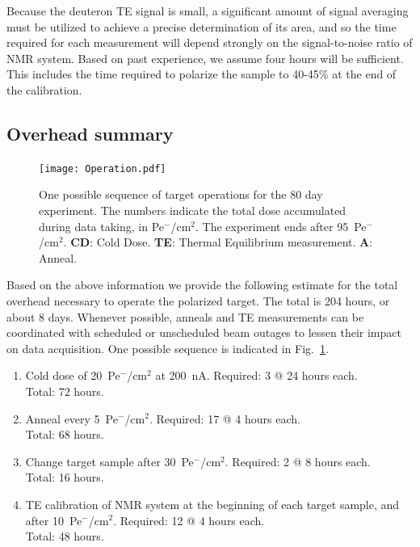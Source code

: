 \documentclass[preprint,12pt]{elsarticle}
\begin{document}
Because the deuteron TE signal is small, a significant amount of signal averaging must be utilized to achieve a precise determination of its area, and so the time required for each measurement will depend strongly on the signal-to-noise ratio of NMR system.  Based on past experience, we assume four hours will be sufficient.  This includes the time required to polarize the sample to 40-45\% at the end of the calibration.

\subsection{Overhead summary}

\begin{figure}
\begin{center}
\texttt{[image: Operation.pdf]}
\end{center}
\caption{One possible sequence of target operations for the 80 day experiment. The numbers indicate the total dose accumulated during data taking, in Pe$^-$/cm$^2$. The experiment ends after 95~Pe$^-$/cm$^2$.
{\bf CD}: Cold Dose.  {\bf TE}: Thermal Equilibrium measurement.  {\bf A}: Anneal. }
\label{Operation}
\end{figure}
Based on the above information we provide the following estimate for the total overhead necessary to operate
the polarized target.  The total is 204 hours, or about 8 days.  Whenever possible, anneals and TE measurements can be coordinated with scheduled or unscheduled beam outages to lessen their impact on data acquisition.  One possible sequence is indicated in Fig.~\ref{Operation}.
\begin{enumerate}
	\item{Cold dose of 20~Pe$^{\minus}$/cm$^2$ at 200~nA.  Required: 3 @ 24 hours each.  \\
	Total: 72 hours.}  
	\item{Anneal every 5~Pe$^{\minus}$/cm$^2$.  Required: 17 @ 4 hours each.  \\
	Total: 68 hours.}
	\item{Change target sample after 30~Pe$^{\minus}$/cm$^2$.  Required: 2 @ 8 hours each.  \\
	Total: 16 hours.}
	\item{TE calibration of NMR system at the beginning of each target sample, and after 
	10~Pe$^{\minus}$/cm$^2$.  Required: 12 @ 4 hours each.  \\
	Total: 48 hours}.
\end{enumerate}
\end{document}
